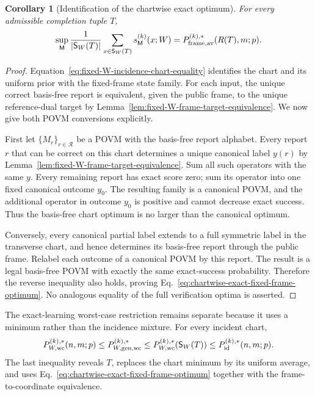 \documentclass[11pt]{article}
\newcommand{\1}{\mathbf 1}
\theoremstyle{plain}
\newtheorem{corollary}[theorem]{Corollary}
\theoremstyle{definition}
\theoremstyle{remark}
\begin{document}
\begin{corollary}[Identification of the chartwise exact optimum]
\label{cor:chartwise-fixed-frame-optima}
For every admissible completion tuple $T$,
\begin{equation}
\sup_{\mathsf M}\frac1{|\mathsf S_W(T)|}
\sum_{x\in\mathsf S_W(T)}s_{\mathsf M}^{(k)}(x;W)
=P_{\rm frame,av}^{(k),*}(R(T),m;p).
\label{eq:chartwise-exact-fixed-frame-optimum}
\end{equation}
\end{corollary}
\begin{proof}
Equation~\eqref{eq:fixed-W-incidence-chart-equality} identifies the chart and
its uniform prior with the fixed-frame state family.  For each input, the
unique correct basis-free report is equivalent, given the public frame, to the
unique reference-dual target by
Lemma~\ref{lem:fixed-W-frame-target-equivalence}.  We now give both POVM
conversions explicitly.

First let $\{M_r\}_{r\in\mathcal R}$ be a POVM with the basis-free report
alphabet.  Every report $r$ that can be correct on this chart determines a
unique canonical label $y(r)$ by
Lemma~\ref{lem:fixed-W-frame-target-equivalence}.  Sum all such operators with
the same $y$.  Every remaining report has exact score zero; sum its operator
into one fixed canonical outcome $y_0$.  The resulting family is a canonical
POVM, and the additional operator in outcome $y_0$ is positive and cannot
decrease exact success.  Thus the basis-free chart optimum is no larger than
the canonical optimum.

Conversely, every canonical partial label extends to a full symmetric label in
the transverse chart, and hence determines its basis-free report through the
public frame.  Relabel each outcome of a canonical POVM by this report.  The
result is a legal basis-free POVM with exactly the same exact-success
probability.  Therefore the reverse inequality also holds, proving
Eq.~\eqref{eq:chartwise-exact-fixed-frame-optimum}.  No analogous equality of
the full verification optima is asserted.
\end{proof}

The exact-learning worst-case restriction remains separate because it uses a
minimum rather than the incidence mixture. For every incident chart,
\begin{equation}
 P_{W,\rm wc}^{(k),*}(n,m;p)
 \le P_{W,\rm gen,wc}^{(k),*}
 \le P_{W,\rm wc}^{(k),*}(\mathsf S_W(T))
 \le P_{\mathrm{id}}^{(k),*}(n,m;p).
 \label{eq:fixed-W-wc-comparison}
\end{equation}
The last inequality reveals $T$, replaces the chart minimum by its uniform
average, and uses Eq.~\eqref{eq:chartwise-exact-fixed-frame-optimum} together
with the frame-to-coordinate equivalence.
\end{document}
